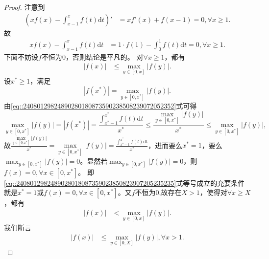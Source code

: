 \documentclass[../../main.tex]{subfiles}%
\begin{document}
\begin{proof}
注意到
\begin{align*}
\left( xf\left( x \right) -\int_{x-1}^x{f\left( t \right) \mathrm{d}t} \right) ' &= xf'\left( x \right) +f\left( x-1 \right) =0,\forall x\geqslant 1. 
\end{align*}
故
\begin{align}
xf\left( x \right) -\int_{x-1}^x{f\left( t \right) \mathrm{d}t} &= 1\cdot f\left( 1 \right) -\int_0^1{f\left( t \right) \mathrm{d}t}=0,\forall x\geqslant 1. \label{eq::24080129824890280180873590238508239072052352}
\end{align}
下面不妨设$f$不恒为$0$，否则结论是平凡的。
对$\forall x\geqslant 1$，都有
\begin{align}
\left| f\left( x \right) \right| &\leqslant \max_{y\in \left[ 0,x \right]} \left| f\left( y \right) \right|. \label{eq::2408012982489028018087359023850823907205235235}
\end{align}
设$x^*\geqslant 1$，满足
\[
\left| f\left( x^* \right) \right|=\max_{y\in \left[ 0,x^* \right]} \left| f\left( y \right) \right|.
\]
由\eqref{eq::24080129824890280180873590238508239072052352}式可得
\[
\max_{y\in \left[ 0,x^* \right]} \left| f\left( y \right) \right|=\left| f\left( x^* \right) \right|=\frac{\int_{x^*-1}^{x^*}{f\left( t \right) \mathrm{d}t}}{x^*}\leqslant \frac{\max\limits_{y\in \left[ 0,x^* \right]} \left| f\left( y \right) \right|}{x^*}\leqslant \max_{y\in \left[ 0,x^* \right]} \left| f\left( y \right) \right|,
\]
故$\frac{\max\limits_{y\in \left[ 0,x^* \right]} \left| f\left( y \right) \right|}{x^*}=\max\limits_{y\in \left[ 0,x^* \right]} \left| f\left( y \right) \right|=\frac{\int_{x^*-1}^{x^*}{f\left( t \right) \mathrm{d}t}}{x^*}$，进而要么$x^*=1$，要么$\max_{y\in \left[ 0,x^* \right]} \left| f\left( y \right) \right|=0$。显然若$\max_{y\in \left[ 0,x^* \right]} \left| f\left( y \right) \right|=0$，则$f\left( x \right) =0,\forall x\in \left[ 0,x^* \right]$。
即\eqref{eq::2408012982489028018087359023850823907205235235}式等号成立的充要条件就是$x^*=1$或$f\left( x \right) =0,\forall x\in \left[ 0,x^* \right]$。又$f$不恒为0,故存在$X> 1$，使得对$\forall x\geqslant X$，都有
\begin{align}
\left| f\left( x \right) \right| &< \max_{y\in \left[ 0,x \right]} \left| f\left( y \right) \right|. \label{eq::2408012982489028018087359023850823907205235236}
\end{align}
我们断言
\begin{align}
\left| f\left( x \right) \right| &\leqslant \max_{y\in \left[ 0,X \right]} \left| f\left( y \right) \right|,\forall x>1. \label{eq::2408012982489028018087359023850823907205235237}

\end{align}
\end{proof}
\end{document}
